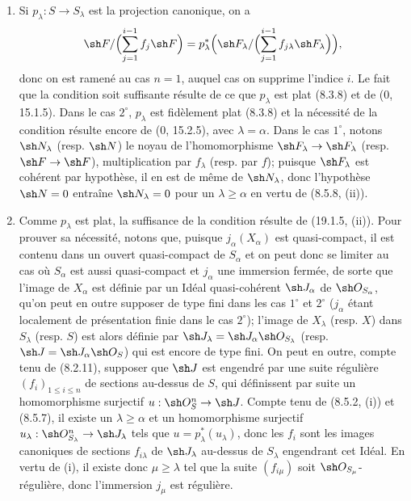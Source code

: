 \begin{enumerate}
  \item[(i)] Si $p_\lambda:S\to S_\lambda$ est la projection canonique, on a
  \[
    \sh F/\Bigl(\sum_{j=1}^{i-1}f_j\sh F\Bigr)
    =p_\lambda^*\Bigl(\sh F_\lambda/\Bigl(\sum_{j=1}^{i-1}f_{j\lambda}\sh F_\lambda\Bigr)\Bigr),
  \]
  donc on est ramené au cas $n=1$, auquel cas on supprime l'indice $i$. Le fait que la condition soit suffisante résulte de ce que $p_\lambda$ est plat (8.3.8) et de ($0$, 15.1.5). Dans le cas $2^\circ$, $p_\lambda$ est fidèlement plat (8.3.8) et la nécessité de la condition résulte encore de ($0$, 15.2.5), avec $\lambda=\alpha$. Dans le cas $1^\circ$, notons $\sh N_\lambda$ (resp. $\sh N$) le noyau de l'homomorphisme $\sh F_\lambda\to\sh F_\lambda$ (resp. $\sh F\to\sh F$), multiplication par $f_\lambda$ (resp. par $f$); puisque $\sh F_\lambda$ est cohérent par hypothèse, il en est de même de $\sh N_\lambda$, donc l'hypothèse $\sh N=0$ entraîne $\sh N_\lambda=0$ pour un $\lambda\geq\alpha$ en vertu de (8.5.8, (ii)).
  \item[(ii)] Comme $p_\lambda$ est plat, la suffisance de la condition résulte de (19.1.5, (ii)). Pour prouver sa nécessité, notons que, puisque $j_\alpha(X_\alpha)$ est quasi-compact, il est contenu dans un ouvert quasi-compact de $S_\alpha$ et on peut donc se limiter au cas où $S_\alpha$ est aussi quasi-compact et $j_\alpha$ une immersion fermée, de sorte que l'image de $X_\alpha$ est définie par un Idéal quasi-cohérent $\sh J_\alpha$ de $\sh O_{S_\alpha}$, qu'on peut en outre supposer de type fini dans les cas $1^\circ$ et $2^\circ$ ($j_\alpha$ étant localement de présentation finie dans le cas $2^\circ$); l'image de $X_\lambda$ (resp. $X$) dans $S_\lambda$ (resp. $S$) est alors définie par $\sh J_\lambda=\sh J_\alpha\sh O_{S_\lambda}$ (resp. $\sh J=\sh J_\alpha\sh O_S$) qui est encore de type fini. On peut en outre, compte tenu de (8.2.11), supposer que $\sh J$ est engendré par une suite régulière $(f_i)_{1\leq i\leq n}$ de sections au-dessus de $S$, qui définissent par suite un homomorphisme surjectif $u:\sh O_S^n\to\sh J$. Compte tenu de (8.5.2, (i)) et (8.5.7), il existe un $\lambda\geq\alpha$ et un homomorphisme surjectif $u_\lambda:\sh O_{S_\lambda}^n\to\sh J_\lambda$ tels que $u=p_\lambda^*(u_\lambda)$, donc les $f_i$ sont les images canoniques de sections $f_{i\lambda}$ de $\sh J_\lambda$ au-dessus de $S_\lambda$ engendrant cet Idéal. En vertu de (i), il existe donc $\mu\geq\lambda$ tel que la suite $(f_{i\mu})$ soit $\sh O_{S_\mu}$-régulière, donc l'immersion $j_\mu$ est régulière.
\end{enumerate}

